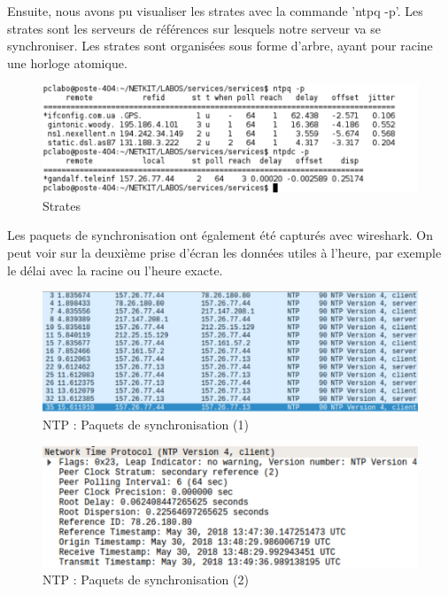 \documentclass{article}
\begin{document}
Ensuite, nous avons pu visualiser les strates avec la commande 'ntpq -p'. Les strates sont les serveurs de références sur lesquels notre serveur va se synchroniser. Les strates sont organisées sous forme d'arbre, ayant pour racine une horloge atomique.

\begin{figure}[h]
	\centering
	\includegraphics{./captures/ntp.png}
	\caption{Strates}
	\label{fig:Strates}
\end{figure}

\clearpage

Les paquets de synchronisation ont également été capturés avec wireshark. On peut voir sur la deuxième prise d'écran les données utiles à l'heure, par exemple le délai avec la racine ou l'heure exacte.

\begin{figure}[h]
	\centering
	\includegraphics{./captures/ntp-capture.png}
	\caption{NTP : Paquets de synchronisation (1)}
	\label{fig:NTP : Paquets de synchronisation (1)}
\end{figure}

\begin{figure}[h]
	\centering
	\includegraphics{./captures/ntp-capture2.png}
	\caption{NTP : Paquets de synchronisation (2)}
	\label{fig:NTP : Paquets de synchronisation (2)}
\end{figure}
\end{document}
